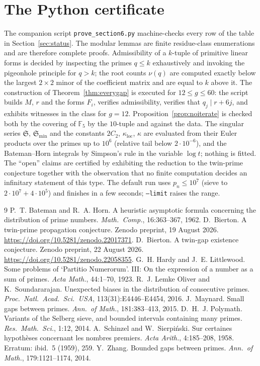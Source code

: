 \documentclass[11pt,a4paper]{article}
\theoremstyle{definition}
\theoremstyle{remark}
\newcommand{\F}{\mathbb{F}}
\newcommand{\Sing}{\mathfrak{S}}
\begin{document}
\section{The Python certificate}\label{sec:code}

The companion script \texttt{prove\_section6.py} machine-checks every row of the table in Section~\ref{sec:status}.
The modular lemmas are finite residue-class enumerations and are therefore complete proofs.
Admissibility of a $k$-tuple of primitive linear forms is decided by inspecting the primes $q\le k$ exhaustively and invoking the pigeonhole principle for $q>k$; the root counts $\nu(q)$ are computed exactly below the largest $2\times 2$ minor of the coefficient matrix and are equal to $k$ above it.
The construction of Theorem~\ref{thm:everygap} is executed for $12\le g\le 60$: the script builds $M$, $r$ and the forms $F_i$, verifies admissibility, verifies that $q_j\mid r+6j$, and exhibits witnesses in the class for $g=12$.
Proposition~\ref{prop:noiterate} is checked both by the covering of $\F_5$ by the $10$-tuple and against the data.
The singular series $\Sing$, $\Sing_{\min}$ and the constants $2C_2$, $\kappa_{\mathrm{loc}}$, $\kappa$ are evaluated from their Euler products over the primes up to $10^6$ (relative tail below $2\cdot 10^{-6}$), and the Bateman--Horn integrals by Simpson's rule in the variable $\log t$; nothing is fitted.
The ``open'' claims are certified by exhibiting the reduction to the twin-prime conjecture together with the observation that no finite computation decides an infinitary statement of this type.
The default run uses $p_n\le 10^7$ (sieve to $2\cdot 10^7 + 4\cdot 10^5$) and finishes in a few seconds; \texttt{--limit} raises the range.

\begin{thebibliography}{9}
 P.~T. Bateman and R.~A. Horn. A heuristic asymptotic formula concerning the distribution of prime numbers. \emph{Math.\ Comp.}, 16:363--367, 1962.
 D.~Bierton. A twin-prime propagation conjecture. Zenodo preprint, 19 August 2026. \url{https://doi.org/10.5281/zenodo.22017371}.
 D.~Bierton. A twin-gap existence conjecture. Zenodo preprint, 22 August 2026. \url{https://doi.org/10.5281/zenodo.22058355}.
 G.~H. Hardy and J.~E. Littlewood. Some problems of `Partitio Numerorum'. III: On the expression of a number as a sum of primes. \emph{Acta Math.}, 44:1--70, 1923.
 R.~J. Lemke Oliver and K.~Soundararajan. Unexpected biases in the distribution of consecutive primes. \emph{Proc.\ Natl.\ Acad.\ Sci.\ USA}, 113(31):E4446--E4454, 2016.
 J.~Maynard. Small gaps between primes. \emph{Ann.\ of Math.}, 181:383--413, 2015.
 D.~H.~J. Polymath. Variants of the Selberg sieve, and bounded intervals containing many primes. \emph{Res.\ Math.\ Sci.}, 1:12, 2014.
 A.~Schinzel and W.~Sierpi\'nski. Sur certaines hypoth\`eses concernant les nombres premiers. \emph{Acta Arith.}, 4:185--208, 1958. Erratum: ibid.\ 5 (1959), 259.
 Y.~Zhang. Bounded gaps between primes. \emph{Ann.\ of Math.}, 179:1121--1174, 2014.
\end{thebibliography}
\end{document}
